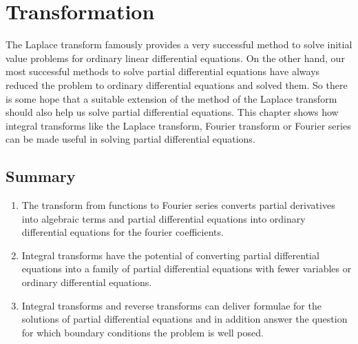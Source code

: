 %
%
%
\chapter{Transformation
\label{chapter:transformation}}
The Laplace transform famously provides a very successful method
to solve initial value problems for ordinary linear differential equations.
On the other hand, our most successful methods to solve partial differential
equations have always reduced the problem to ordinary differential
equations and solved them.
So there is some hope that a suitable extension of the method of the
Laplace transform should also help us solve partial differential
equations.
This chapter shows how integral transforms like the Laplace transform,
Fourier transform or Fourier series can be made useful in solving
partial differential equations.







\section{Summary}
\begin{enumerate}
\item
The transform from functions to Fourier series converts
partial derivatives into algebraic terms and partial differential
equations into ordinary differential equations for the
fourier coefficients.
\item
Integral transforms have the potential of converting partial differential
equations into a family of partial differential equations with fewer
variables or ordinary differential equations.
\item
Integral transforms and reverse transforms can deliver formulae for the
solutions of partial differential equations and in addition answer
the question for which boundary conditions the problem is well posed.
\end{enumerate}
